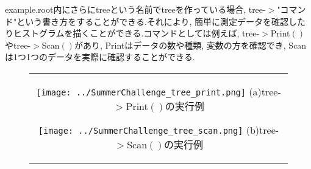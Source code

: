 example.root内にさらにtreeという名前でtreeを作っている場合, tree-$>$"コマンド"という書き方をすることができる.それにより, 簡単に測定データを確認したりヒストグラムを描くことができる.コマンドとしては例えば, tree-$>$Print$\left(\right)$やtree-$>$Scan$\left(\right)$があり, Printはデータの数や種類, 変数の方を確認でき, Scanは1つ1つのデータを実際に確認することができる.
\begin{figure}[htbp]
  \begin{center}
    \begin{tabular}{c}

      \begin{minipage}{0.5\hsize}
        \begin{center}
          \texttt{[image: ../SummerChallenge\_tree\_print.png]}
          \hspace{1.6cm} (a)tree-$>$Print$\left(\right)$の実行例
        \end{center}
      \end{minipage}

      \begin{minipage}{0.5\hsize}
        \begin{center}
          \texttt{[image: ../SummerChallenge\_tree\_scan.png]}
          \hspace{1.6cm} (b)tree-$>$Scan$\left(\right)$の実行例
        \end{center}
      \end{minipage}
    \end{tabular}
  \end{center}
\end{figure}

